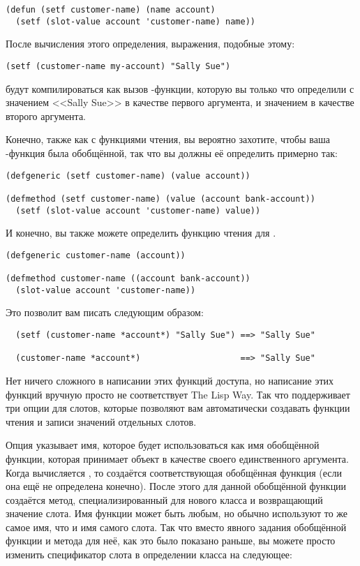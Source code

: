 \begin{lstlisting}
(defun (setf customer-name) (name account)
  (setf (slot-value account 'customer-name) name))
\end{lstlisting}

После вычисления этого определения, выражения, подобные этому:

\begin{lstlisting}
(setf (customer-name my-account) "Sally Sue")
\end{lstlisting}

будут компилироваться как вызов -функции, которую вы только что определили с
значением <<Sally Sue>> в качестве первого аргумента, и значением  в
качестве второго аргумента.

Конечно, также как с функциями чтения, вы вероятно захотите, чтобы ваша
-функция была обобщённой, так что вы должны её определить примерно так:

\begin{lstlisting}
(defgeneric (setf customer-name) (value account))

(defmethod (setf customer-name) (value (account bank-account))
  (setf (slot-value account 'customer-name) value))
\end{lstlisting}

И конечно, вы также можете определить функцию чтения для .

\begin{lstlisting}
(defgeneric customer-name (account))

(defmethod customer-name ((account bank-account))
  (slot-value account 'customer-name))
\end{lstlisting}

Это позволит вам писать следующим образом:

\begin{verbatim}
  (setf (customer-name *account*) "Sally Sue") ==> "Sally Sue"

  (customer-name *account*)                    ==> "Sally Sue"
\end{verbatim}

Нет ничего сложного в написании этих функций доступа, но написание этих функций вручную
просто не соответствует The Lisp Way.  Так что  поддерживает три опции для
слотов, которые позволяют вам автоматически создавать функции чтения и записи значений
отдельных слотов.

Опция  указывает имя, которое будет использоваться как имя обобщённой
функции, которая принимает объект в качестве своего единственного аргумента.  Когда
вычисляется , то создаётся соответствующая обобщённая функция (если она ещё
не определена конечно).  После этого для данной обобщённой функции создаётся метод,
специализированный для нового класса и возвращающий значение слота.  Имя функции может
быть любым, но обычно используют то же самое имя, что и имя самого слота.  Так что вместо
явного задания обобщённой функции  и метода для неё, как это было показано
раньше, вы можете просто изменить спецификатор слота  в определении класса
 на следующее:

